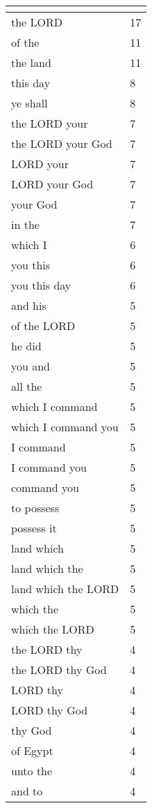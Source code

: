\begin{center}
\begin{longtable}{|p{3.0in}|p{0.5in}|}
\hline \multicolumn{2}{c}{{ }} \\ \hline
\endfoot 
the LORD & 17\\ \hline 
of the & 11\\ \hline 
the land & 11\\ \hline 
this day & 8\\ \hline 
ye shall & 8\\ \hline 
the LORD your & 7\\ \hline 
the LORD your God & 7\\ \hline 
LORD your & 7\\ \hline 
LORD your God & 7\\ \hline 
your God & 7\\ \hline 
in the & 7\\ \hline 
which I & 6\\ \hline 
you this & 6\\ \hline 
you this day & 6\\ \hline 
and his & 5\\ \hline 
of the LORD & 5\\ \hline 
he did & 5\\ \hline 
you and & 5\\ \hline 
all the & 5\\ \hline 
which I command & 5\\ \hline 
which I command you & 5\\ \hline 
I command & 5\\ \hline 
I command you & 5\\ \hline 
command you & 5\\ \hline 
to possess & 5\\ \hline 
possess it & 5\\ \hline 
land which & 5\\ \hline 
land which the & 5\\ \hline 
land which the LORD & 5\\ \hline 
which the & 5\\ \hline 
which the LORD & 5\\ \hline 
the LORD thy & 4\\ \hline 
the LORD thy God & 4\\ \hline 
LORD thy & 4\\ \hline 
LORD thy God & 4\\ \hline 
thy God & 4\\ \hline 
of Egypt & 4\\ \hline 
unto the & 4\\ \hline 
and to & 4\\ \hline 

\end{longtable}
\end{center}
